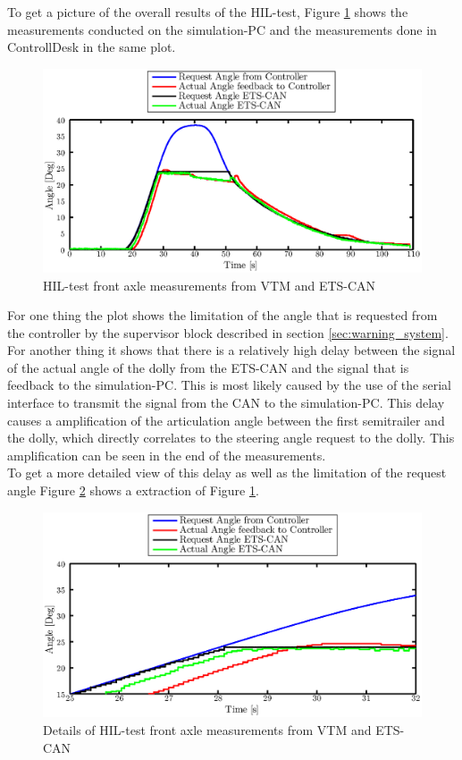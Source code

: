 \documentclass[ExampleMasters.tex]{subfiles}
\begin{document}
To get a picture of the overall results of the HIL-test, Figure \ref{fig:HIL002_complete} shows the measurements conducted on the simulation-PC and the measurements done in ControllDesk in the same plot.  
\begin{figure}[!htb]
	\centering
	\includegraphics[width=1\linewidth]{figures/HIL006_alles}
	\caption{HIL-test front axle measurements from VTM and ETS-CAN}	
	\label{fig:HIL002_complete}
\end{figure}

For one thing the plot shows the limitation of the angle that is requested from the controller by the supervisor block described in section \ref{sec:warning_system}. For another thing it shows that there is a relatively high delay between the signal of the actual angle of the dolly from the ETS-CAN and the signal that is feedback to the simulation-PC. This is most likely caused by the use of the serial interface to transmit the signal from the CAN to the simulation-PC. This delay causes a amplification of the articulation angle between the first semitrailer and the dolly, which directly correlates to the steering angle request to the dolly. This amplification can be seen in the end of the measurements.\\
To get a more detailed view of this delay as well as the limitation of the request angle Figure \ref{fig:HIL002_complete_details} shows a extraction of Figure \ref{fig:HIL002_complete}.   

\begin{figure}[!htb]
	\centering
	\includegraphics[width=1\linewidth]{figures/HIL006_alles_details}
	\caption{Details of HIL-test front axle measurements from VTM and ETS-CAN}
	
	\label{fig:HIL002_complete_details}
\end{figure}
\end{document}
